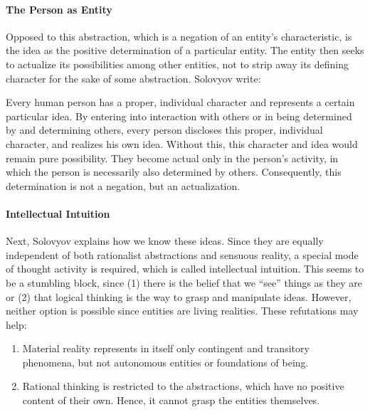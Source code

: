 \paragraph{The Person as Entity}


Opposed to this abstraction, which is a negation of an entity's characteristic, is the idea as the positive determination of a particular entity. The entity then seeks to actualize its possibilities among other entities, not to strip away its defining character for the sake of some abstraction. Solovyov write:

\begin{quotex}
Every human person has a proper, individual character and represents a certain particular idea. By entering into interaction with others or in being determined by and determining others, every person discloses this proper, individual character, and realizes his own idea. Without this, this character and idea would remain pure possibility. They become actual only in the person's activity, in which the person is necessarily also determined by others. Consequently, this determination is not a negation, but an actualization.
\end{quotex}


\paragraph{Intellectual Intuition}


Next, Solovyov explains how we know these ideas. Since they are equally independent of both rationalist abstractions and sensuous reality, a special mode of thought activity is required, which is called intellectual intuition. This seems to be a stumbling block, since (1) there is the belief that we ``see'' things as they are or (2) that logical thinking is the way to grasp and manipulate ideas. However, neither option is possible since entities are living realities. These refutations may help:

\begin{enumerate}


\item Material reality represents in itself only contingent and transitory phenomena, but not autonomous entities or foundations of being.

\item Rational thinking is restricted to the abstractions, which have no positive content of their own. Hence, it cannot grasp the entities themselves.
\end{enumerate}


